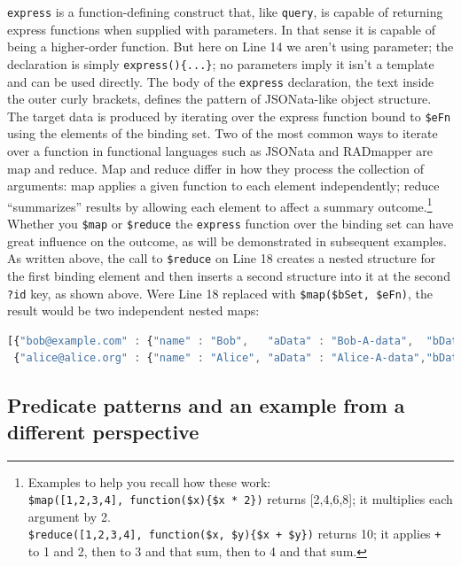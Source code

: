 \documentclass[9pt,letterpaper]{article}
\newcommand{\stt}[1]{\texttt{#1}} %
\begin{document}
\stt{express} is a function-defining construct that, like \stt{query}, is capable of returning express functions when supplied with parameters.
In that sense it is capable of being a higher-order function.
But here on Line 14 we aren't using parameter; the declaration is simply \stt{express()\{...\}}; no parameters imply it isn't a template and can be used directly.
The body of the \stt{express} declaration, the text inside the outer curly brackets, defines the pattern of JSONata-like object structure.
The target data is produced by iterating over the express function bound to \stt{\$eFn} using the elements of the binding set.
Two of the most common ways to iterate over a function in functional languages such as JSONata and RADmapper are map and reduce.
Map and reduce differ in how they process the collection of arguments:
map applies a given function to each element independently;
reduce ``summarizes'' results by allowing each element to affect a summary outcome.\footnote{Examples to help you recall how these work:
  \\ \stt{\$map([1,2,3,4], function(\$x)\{\$x * 2\})} returns [2,4,6,8]; it multiplies each argument by 2.
  \\ \stt{\$reduce([1,2,3,4], function(\$x, \$y)\{\$x + \$y\})} returns 10; it applies \stt{+} to 1 and 2, then to 3 and that sum,
  then to 4 and that sum.}
Whether you \stt{\$map} or \stt{\$reduce} the \stt{express} function over the binding set can have great influence on the outcome, as will be demonstrated in subsequent examples.
As written above, the call to \stt{\$reduce} on Line 18 creates a nested structure for the first binding element and then inserts a second structure into it at the second \stt{?id} key, as shown above.
Were Line 18 replaced with \stt{\$map(\$bSet, \$eFn)}, the result would be two independent nested maps:

\begin{lstlisting}[language=JavaScript,basicstyle=\ttfamily\scriptsize,numbers=none]
[{"bob@example.com" : {"name" : "Bob",   "aData" : "Bob-A-data",  "bData" : "Bob-B-data"  }},
 {"alice@alice.org" : {"name" : "Alice", "aData" : "Alice-A-data","bData" : "Alice-B-data"}}].
\end{lstlisting} \vspace{-2em}

\subsection{Predicate patterns and an example from a different perspective}
\end{document}
